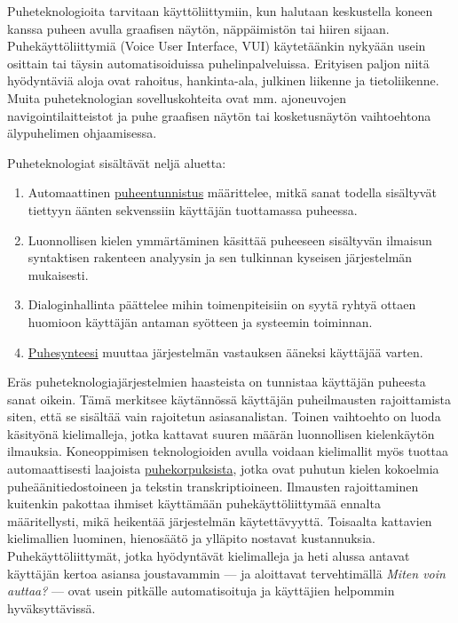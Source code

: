 \documentclass[]{../../metanetpaper}
\begin{document}
\begin{multicols}{2}

Puheteknologioita tarvitaan käyttöliittymiin, kun halutaan keskustella koneen 
kanssa puheen avulla graafisen näytön, näppäimistön tai hiiren sijaan. 
Puhekäyttöliittymiä (Voice User Interface, VUI) käytetäänkin nykyään usein osittain tai täysin
automatisoiduissa puhelinpalveluissa. Erityisen paljon niitä hyödyntäviä aloja ovat 
rahoitus, hankinta-ala, julkinen liikenne ja tietoliikenne. Muita
puheteknologian sovelluskohteita ovat mm. ajoneuvojen
navigointilaitteistot ja puhe graafisen näytön tai kosketusnäytön
vaihtoehtona älypuhelimen ohjaamisessa.

Puheteknologiat sisältävät neljä aluetta:
\begin{enumerate}

\item Automaattinen \underline{puheentunnistus} määrittelee, mitkä
    sanat todella sisältyvät tiettyyn äänten sekvenssiin käyttäjän
    tuottamassa
    puheessa.

\item Luonnollisen kielen ymmärtäminen käsittää puheeseen sisältyvän
    ilmaisun syntaktisen rakenteen analyysin ja sen tulkinnan kyseisen
    järjestelmän mukaisesti.

\item Dialoginhallinta päättelee mihin toimenpiteisiin on syytä ryhtyä
    ottaen huomioon käyttäjän antaman syötteen ja systeemin toiminnan.

\item \underline{Puhesynteesi} muuttaa järjestelmän vastauksen
    ääneksi käyttäjää
    varten.

\end{enumerate}
Eräs puheteknologiajärjestelmien haasteista on tunnistaa käyttäjän
puheesta sanat oikein. Tämä merkitsee käytännössä käyttäjän
puheilmausten rajoittamista siten, että se sisältää vain rajoitetun
asiasanalistan. Toinen vaihtoehto on luoda käsityönä kielimalleja,
jotka kattavat suuren määrän luonnollisen kielenkäytön
ilmauksia. Koneoppimisen teknologioiden avulla voidaan kielimallit
myös tuottaa automaattisesti laajoista \underline{puhekorpuksista}, jotka ovat
puhutun kielen kokoelmia puheäänitiedostoineen ja tekstin
transkriptioineen. Ilmausten rajoittaminen kuitenkin pakottaa ihmiset
käyttämään puhekäyttöliittymää ennalta määritellysti, mikä heikentää järjestelmän
käytettävyyttä. Toisaalta kattavien kielimallien luominen, hienosäätö
ja ylläpito nostavat kustannuksia. Puhekäyttöliittymät, jotka hyödyntävät kielimalleja ja
heti alussa antavat käyttäjän kertoa asiansa joustavammin —
ja aloittavat tervehtimällä \textit{Miten voin auttaa?} — ovat usein
pitkälle automatisoituja ja käyttäjien helpommin hyväksyttävissä.


\end{multicols}
\end{document}
